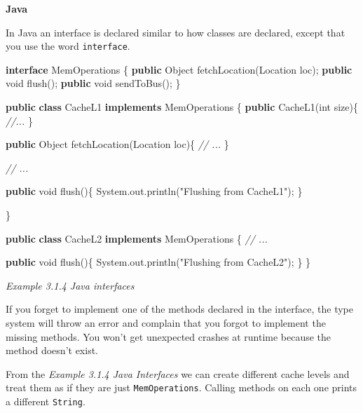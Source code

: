 \documentclass[]{article}
\newenvironment{Shaded}{\begin{snugshade}}{\end{snugshade}}
\newcommand{\KeywordTok}[1]{\textcolor[rgb]{0.13,0.29,0.53}{\textbf{{#1}}}}
\newcommand{\DataTypeTok}[1]{\textcolor[rgb]{0.13,0.29,0.53}{{#1}}}
\newcommand{\StringTok}[1]{\textcolor[rgb]{0.31,0.60,0.02}{{#1}}}
\newcommand{\CommentTok}[1]{\textcolor[rgb]{0.56,0.35,0.01}{\textit{{#1}}}}
\newcommand{\FunctionTok}[1]{\textcolor[rgb]{0.00,0.00,0.00}{{#1}}}
\newcommand{\BuiltInTok}[1]{{#1}}
\newcommand{\NormalTok}[1]{{#1}}
\begin{document}
\textbf{Java}

In Java an interface is declared similar to how classes are declared,
except that you use the word \texttt{interface}.

\begin{Shaded}
\begin{Highlighting}[]
\KeywordTok{interface} \NormalTok{MemOperations \{}
  \KeywordTok{public} \BuiltInTok{Object} \FunctionTok{fetchLocation}\NormalTok{(}\BuiltInTok{Location} \NormalTok{loc);}
  \KeywordTok{public} \DataTypeTok{void} \FunctionTok{flush}\NormalTok{();}
  \KeywordTok{public} \DataTypeTok{void} \FunctionTok{sendToBus}\NormalTok{();}
\NormalTok{\}}

\KeywordTok{public} \KeywordTok{class} \NormalTok{CacheL1 }\KeywordTok{implements} \NormalTok{MemOperations \{}
  \KeywordTok{public} \FunctionTok{CacheL1}\NormalTok{(}\DataTypeTok{int} \NormalTok{size)\{}
    \CommentTok{//...}
  \NormalTok{\}}

  \KeywordTok{public} \BuiltInTok{Object} \FunctionTok{fetchLocation}\NormalTok{(}\BuiltInTok{Location} \NormalTok{loc)\{}
    \CommentTok{// ...}
  \NormalTok{\}}

  \CommentTok{// ...}

  \KeywordTok{public} \DataTypeTok{void} \FunctionTok{flush}\NormalTok{()\{}
    \BuiltInTok{System}\NormalTok{.}\FunctionTok{out}\NormalTok{.}\FunctionTok{println}\NormalTok{(}\StringTok{"Flushing from CacheL1"}\NormalTok{);}
  \NormalTok{\}}

\NormalTok{\}}

\KeywordTok{public} \KeywordTok{class} \NormalTok{CacheL2 }\KeywordTok{implements} \NormalTok{MemOperations \{}
  \CommentTok{// ...}

  \KeywordTok{public} \DataTypeTok{void} \FunctionTok{flush}\NormalTok{()\{}
    \BuiltInTok{System}\NormalTok{.}\FunctionTok{out}\NormalTok{.}\FunctionTok{println}\NormalTok{(}\StringTok{"Flushing from CacheL2"}\NormalTok{);}
  \NormalTok{\}}
\NormalTok{\}}
\end{Highlighting}
\end{Shaded}

\emph{Example 3.1.4 Java interfaces}

If you forget to implement one of the methods declared in the interface,
the type system will throw an error and complain that you forgot to
implement the missing methods. You won't get unexpected crashes at
runtime because the method doesn't exist.

From the \emph{Example 3.1.4 Java Interfaces} we can create different
cache levels and treat them as if they are just \texttt{MemOperations}.
Calling methods on each one prints a different \texttt{String}.
\end{document}
